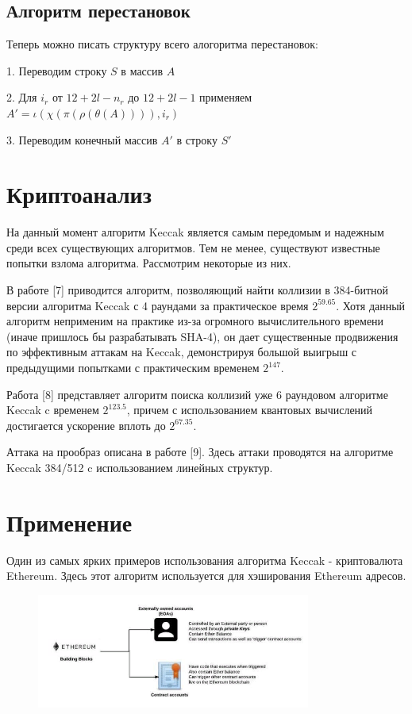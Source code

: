 \documentclass[a4paper,12pt]{article}
\theoremstyle{plain} %
\theoremstyle{definition} %
\theoremstyle{remark} %
\begin{document}
	\subsection{Алгоритм перестановок}
	
	Теперь можно писать структуру всего алогоритма перестановок:
	
	1. Переводим строку $S$ в массив $A$
	
	2. Для $i_r$ от $12 + 2l - n_r$ до $12 + 2l - 1$ применяем $A' = \iota(\chi(\pi(\rho(\theta(A)))), i_r)$
	
	3. Переводим конечный массив $A'$ в строку $S'$
	
	
	\section{Криптоанализ}
	
	На данный момент алгоритм Keccak является самым передомым и надежным среди всех существующих алгоритмов. Тем не менее, существуют известные попытки взлома алгоритма. Рассмотрим некоторые из них.
	
	В работе [7] приводится алгоритм, позволяющий найти коллизии в 384-битной версии алгоритма Keccak с 4 раундами за практическое время $2^{59.65}$. Хотя данный алгоритм неприменим на практике из-за огромного вычислительного времени (иначе пришлось бы разрабатывать SHA-4), он дает существенные продвижения по эффективным аттакам на Keccak, демонстрируя большой выигрыш с предыдущими попытками с практическим временем $2^{147}$. 
	
	Работа [8] представляет алгоритм поиска коллизий уже 6 раундовом алгоритме Keccak c временем $2^{123.5}$, причем с использованием квантовых вычислений достигается ускорение вплоть до $2^{67.35}$.
	
	Аттака на прообраз описана в работе [9]. Здесь аттаки проводятся на алгоритме Keccak 384/512 c использованием линейных структур.
	
	
	
	\section{Применение}
	
	Один из самых ярких примеров использования алгоритма Keccak - криптовалюта Ethereum. Здесь этот алгоритм используется для хэширования Ethereum адресов.
	
	\begin{figure}[h!]
		\centering
		\includegraphics[width=90mm]{3.png}
	\end{figure}
	
\end{document}
